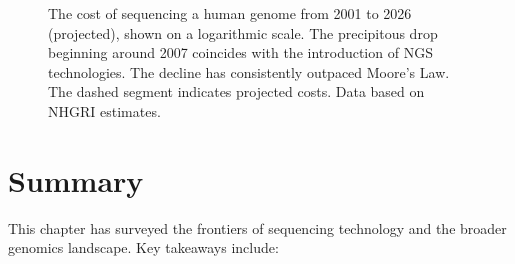 \begin{figure}[htbp]
\caption[Sequencing cost trajectory: 2001--2026.]{The cost of sequencing a human genome from 2001 to 2026 (projected), shown on a logarithmic scale. The precipitous drop beginning around 2007 coincides with the introduction of NGS technologies. The decline has consistently outpaced Moore's Law. The dashed segment indicates projected costs. Data based on NHGRI estimates.}
\label{fig:emerging:cost-trajectory}
\end{figure}


\section{Summary}
\label{sec:emerging:summary}

This chapter has surveyed the frontiers of sequencing technology and the broader genomics landscape. Key takeaways include:

